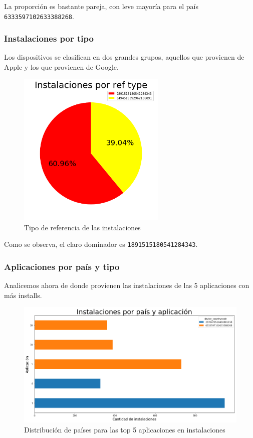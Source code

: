 \documentclass[a4paper, 12pt]{article}
\begin{document}
		La proporción es bastante pareja, con leve mayoría para el país \texttt{6333597102633388268}.

	\subsubsection{Instalaciones por tipo}
		Los dispositivos se clasifican en dos grandes grupos, aquellos que provienen de Apple y los que provienen de Google.

		\FloatBarrier
		\begin{figure}[h]
			\centering
			\includegraphics[width= 200pt]{images/installs/ref_type.png}
			\caption{Tipo de referencia de las instalaciones}
		\end{figure}
		\FloatBarrier

		Como se observa, el claro dominador es \texttt{1891515180541284343}.

	\subsubsection{Aplicaciones por país y tipo}

		Analicemos ahora de donde provienen las instalaciones de las 5 aplicaciones con más installs.

		\FloatBarrier
		\begin{figure}[h]
			\centering
			\includegraphics[width=\textwidth]{images/installs/appsxpais.png}
			\caption{Distribución de países para las top 5 aplicaciones en instalaciones}
		\end{figure}
		\FloatBarrier
\end{document}
